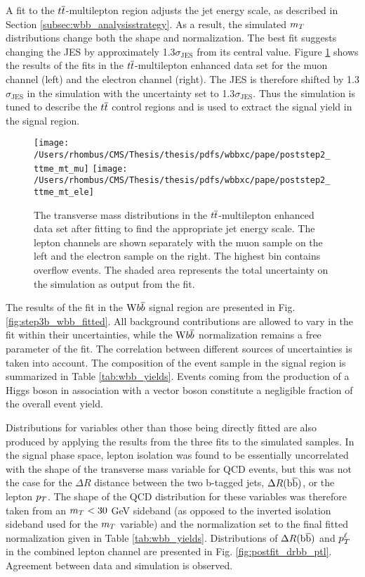 A fit to the $\ttbar$-multilepton region adjusts
 the jet energy scale, as described in Section \ref{subsec:wbb_analysisstrategy}.
As a result, the simulated $m_T$ distributions
 change both the shape and normalization.
The best fit suggests changing the
 JES by approximately 1.3$\sigma_{\mathrm{JES}}$ from its central value.
Figure \ref{fig:step2_ttme_fitted}
 shows the results of the fits in the $\ttbar$-multilepton
 enhanced data set for
 the muon channel (left)
 and the electron channel (right).
The JES is therefore shifted by 1.3$\sigma_{\mathrm{JES}}$ in
 the simulation with the uncertainty
 set to 1.3$\sigma_{\mathrm{JES}}$.
Thus the simulation is tuned to describe the $\ttbar$
 control regions and is
 used to extract the signal yield in the signal region.

\begin{figure}[htbp]
\caption[$\ttbar$-multilepton control region after fitting for JES]{
  The transverse mass distributions in the $\ttbar$-multilepton enhanced data set after
   fitting to find the appropriate jet energy scale.
  The lepton channels are shown separately with the muon sample on the left and the electron sample on the right.
  The highest bin contains overflow events.
 The shaded area represents the total uncertainty on the simulation as output from the fit.
 }
\center
\texttt{[image: /Users/rhombus/CMS/Thesis/thesis/pdfs/wbbxc/pape/poststep2\_ttme\_mt\_mu]}
\texttt{[image: /Users/rhombus/CMS/Thesis/thesis/pdfs/wbbxc/pape/poststep2\_ttme\_mt\_ele]}
\label{fig:step2_ttme_fitted}
\end{figure}

The results of the fit in the $\mathrm{W} b\overline{b}$ signal region
 are presented in Fig. \ref{fig:step3b_wbb_fitted}.
All background contributions are allowed to vary
 in the fit within their uncertainties,
 while the $\mathrm{W} b\overline{b}$ normalization remains a free parameter of the fit.
The correlation between different sources of uncertainties
 is taken into account.
The composition of the event sample in
 the signal region is summarized in Table \ref{tab:wbb_yields}.
Events coming from the production of a Higgs boson in association
 with a vector boson constitute a negligible fraction of the
 overall event yield.

Distributions for variables other than those being directly fitted are
 also produced by applying the results from the three fits to
 the simulated samples.
In the signal phase space, lepton isolation was found to be essentially uncorrelated
 with the shape of the transverse mass variable for QCD events,
 but this was not the case for the $\Delta R$ distance between the
 two b-tagged jets, $\Delta R(\mathrm{b\overline{b}})$, or the lepton $p_T$.
The shape of the QCD distribution for these variables was therefore
 taken from an $m_T<30$ GeV sideband (as opposed to the inverted isolation
 sideband used for the $m_T$ variable) and the normalization
 set to the final fitted normalization given in Table \ref{tab:wbb_yields}.
Distributions of $\Delta R(\mathrm{b\overline{b}})$ and $p_T^\ell$ in the
 combined lepton channel are presented in Fig. \ref{fig:postfit_drbb_ptl}.
Agreement between data and simulation is observed.

